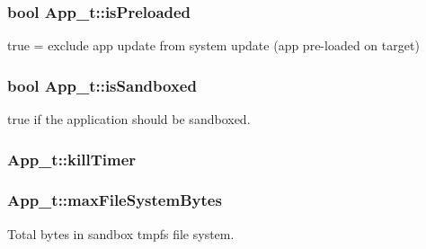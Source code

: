 \subsubsection[{\texorpdfstring{is\+Preloaded}{isPreloaded}}]{\setlength{\rightskip}{0pt plus 5cm}bool App\+\_\+t\+::is\+Preloaded}\hypertarget{struct_app__t_a9bcfffd1c006082814e8a953c5140078}{}\label{struct_app__t_a9bcfffd1c006082814e8a953c5140078}


true = exclude app update from system update (app pre-\/loaded on target) 

\subsubsection[{\texorpdfstring{is\+Sandboxed}{isSandboxed}}]{\setlength{\rightskip}{0pt plus 5cm}bool App\+\_\+t\+::is\+Sandboxed}\hypertarget{struct_app__t_a63b6c9be6a010cfcbaea6ded9de03240}{}\label{struct_app__t_a63b6c9be6a010cfcbaea6ded9de03240}


true if the application should be sandboxed. 

\subsubsection[{\texorpdfstring{kill\+Timer}{killTimer}}]{ App\+\_\+t\+::kill\+Timer}\hypertarget{struct_app__t_a8c3e38fbbdf3d07254ed93b3ac8549f4}{}\label{struct_app__t_a8c3e38fbbdf3d07254ed93b3ac8549f4}
\subsubsection[{\texorpdfstring{max\+File\+System\+Bytes}{maxFileSystemBytes}}]{ App\+\_\+t\+::max\+File\+System\+Bytes}\hypertarget{struct_app__t_a195ae0750ae4b3a9634ddd99b688dc37}{}\label{struct_app__t_a195ae0750ae4b3a9634ddd99b688dc37}


Total bytes in sandbox tmpfs file system. 

